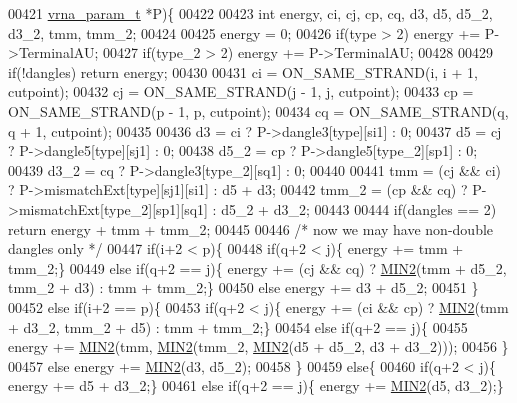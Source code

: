 \begin{DoxyCode}
00421               \hyperlink{group__energy__parameters_structvrna__param__s}{vrna\_param\_t} *P)\{
00422 
00423   \textcolor{keywordtype}{int} energy, ci, cj, cp, cq, d3, d5, d5\_2, d3\_2, tmm, tmm\_2;
00424 
00425   energy = 0;
00426   \textcolor{keywordflow}{if}(type > 2)   energy += P->TerminalAU;
00427   \textcolor{keywordflow}{if}(type\_2 > 2) energy += P->TerminalAU;
00428 
00429   \textcolor{keywordflow}{if}(!dangles) \textcolor{keywordflow}{return} energy;
00430 
00431   ci = ON\_SAME\_STRAND(i, i + 1, cutpoint);
00432   cj = ON\_SAME\_STRAND(j - 1, j, cutpoint);
00433   cp = ON\_SAME\_STRAND(p - 1, p, cutpoint);
00434   cq = ON\_SAME\_STRAND(q, q + 1, cutpoint);
00435 
00436   d3    = ci  ? P->dangle3[type][si1]   : 0;
00437   d5    = cj  ? P->dangle5[type][sj1]   : 0;
00438   d5\_2  = cp  ? P->dangle5[type\_2][sp1] : 0;
00439   d3\_2  = cq  ? P->dangle3[type\_2][sq1] : 0;
00440 
00441   tmm   = (cj && ci) ? P->mismatchExt[type][sj1][si1]   : d5 + d3;
00442   tmm\_2 = (cp && cq) ? P->mismatchExt[type\_2][sp1][sq1] : d5\_2 + d3\_2;
00443 
00444   \textcolor{keywordflow}{if}(dangles == 2) \textcolor{keywordflow}{return} energy + tmm + tmm\_2;
00445 
00446   \textcolor{comment}{/* now we may have non-double dangles only */}
00447   \textcolor{keywordflow}{if}(i+2 < p)\{
00448     \textcolor{keywordflow}{if}(q+2 < j)\{ energy += tmm + tmm\_2;\}
00449     \textcolor{keywordflow}{else} \textcolor{keywordflow}{if}(q+2 == j)\{ energy += (cj && cq) ? \hyperlink{group__utils_ga2dd4a927a7f937f43a90c144d79107d8}{MIN2}(tmm + d5\_2, tmm\_2 + d3) : tmm + tmm\_2;\}
00450     \textcolor{keywordflow}{else} energy += d3 + d5\_2;
00451   \}
00452   \textcolor{keywordflow}{else} \textcolor{keywordflow}{if}(i+2 == p)\{
00453     \textcolor{keywordflow}{if}(q+2 < j)\{ energy += (ci && cp) ? \hyperlink{group__utils_ga2dd4a927a7f937f43a90c144d79107d8}{MIN2}(tmm + d3\_2, tmm\_2 + d5) : tmm + tmm\_2;\}
00454     \textcolor{keywordflow}{else} \textcolor{keywordflow}{if}(q+2 == j)\{
00455       energy += \hyperlink{group__utils_ga2dd4a927a7f937f43a90c144d79107d8}{MIN2}(tmm, \hyperlink{group__utils_ga2dd4a927a7f937f43a90c144d79107d8}{MIN2}(tmm\_2, \hyperlink{group__utils_ga2dd4a927a7f937f43a90c144d79107d8}{MIN2}(d5 + d5\_2, d3 + d3\_2)));
00456     \}
00457     \textcolor{keywordflow}{else} energy += \hyperlink{group__utils_ga2dd4a927a7f937f43a90c144d79107d8}{MIN2}(d3, d5\_2);
00458   \}
00459   \textcolor{keywordflow}{else}\{
00460     \textcolor{keywordflow}{if}(q+2 < j)\{ energy += d5 + d3\_2;\}
00461     \textcolor{keywordflow}{else} \textcolor{keywordflow}{if}(q+2 == j)\{ energy += \hyperlink{group__utils_ga2dd4a927a7f937f43a90c144d79107d8}{MIN2}(d5, d3\_2);\}

\end{DoxyCode}
